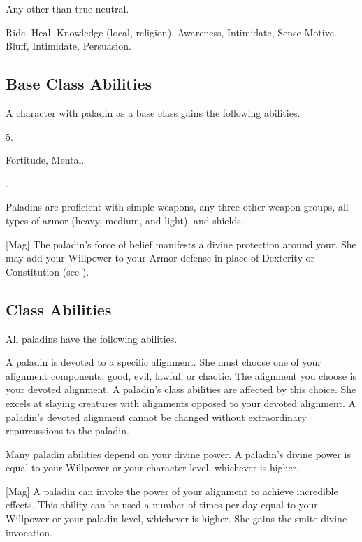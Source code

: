      Any other than true neutral.

     Ride.
     Heal, Knowledge (local, religion).
     Awareness, Intimidate, Sense Motive.
     Bluff, Intimidate, Persuasion.

    \subsection{Base Class Abilities}
        A character with paladin as a base class gains the following abilities.

         5.

          Fortitude,  Mental.

         .

        Paladins are proficient with simple weapons, any three other weapon groups, all types of armor (heavy, medium, and light), and shields.

        [Mag]
        The paladin's force of belief manifests a divine protection around your.
        She may add your Willpower to your Armor defense in place of Dexterity or Constitution (see ).

    \subsection{Class Abilities}
        All paladins have the following abilities.

        A paladin is devoted to a specific alignment.
        She must choose one of your alignment components: good, evil, lawful, or chaotic.
        The alignment you choose is your devoted alignment.
        A paladin's class abilities are affected by this choice.
        She excels at slaying creatures with alignments opposed to your devoted alignment.
        A paladin's devoted alignment cannot be changed without extraordinary repurcussions to the paladin.

        Many paladin abilities depend on your divine power.
        A paladin's divine power is equal to your Willpower or your character level, whichever is higher.

        [Mag]
        A paladin can invoke the power of your alignment to achieve incredible effects.
        This ability can be used a number of times per day equal to your Willpower or your paladin level, whichever is higher.
        She gains the smite divine invocation.

